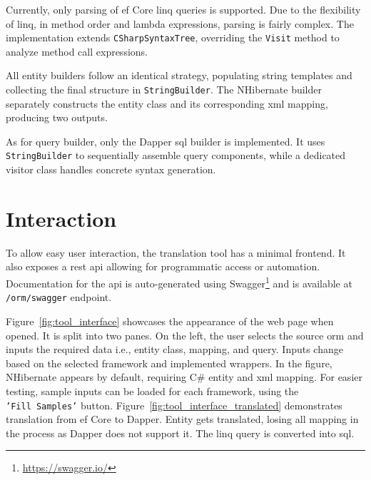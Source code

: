 Currently, only parsing of \acrshort{ef} Core \acrshort{linq} queries is supported. Due to the flexibility of \acrshort{linq}, in method order and lambda expressions, parsing is fairly complex. The implementation extends \texttt{CSharpSyntaxTree}, overriding the \texttt{Visit} method to analyze method call expressions. 

All entity builders follow an identical strategy, populating string templates and collecting the final structure in \texttt{StringBuilder}. The NHibernate builder separately constructs the entity class and its corresponding \acrshort{xml} mapping, producing two outputs.

As for query builder, only the Dapper \acrshort{sql} builder is implemented. It uses \texttt{StringBuilder} to sequentially assemble query components, while a dedicated visitor class handles concrete syntax generation.


\section{Interaction}
To allow easy user interaction, the translation tool has a minimal frontend. It also exposes a \acrshort{rest} \acrshort{api} allowing for programmatic access or automation. Documentation for the \acrshort{api} is auto-generated using Swagger\footnote{\url{https://swagger.io/}} and is available at \texttt{/orm/swagger} endpoint.

Figure~\ref{fig:tool_interface} showcases the appearance of the web page when opened. It is split into two panes. On the left, the user selects the source \acrshort{orm} and inputs the required data i.e., entity class, mapping, and query. Inputs change based on the selected framework and implemented wrappers. In the figure, NHibernate appears by default, requiring C\# entity and \acrshort{xml} mapping. For easier testing, sample inputs can be loaded for each framework, using the \texttt{'Fill~Samples'} button. Figure~\ref{fig:tool_interface_translated} demonstrates translation from \acrshort{ef} Core to Dapper. Entity gets translated, losing all mapping in the process as Dapper does not support it. The \acrshort{linq} query is converted into \acrshort{sql}.

